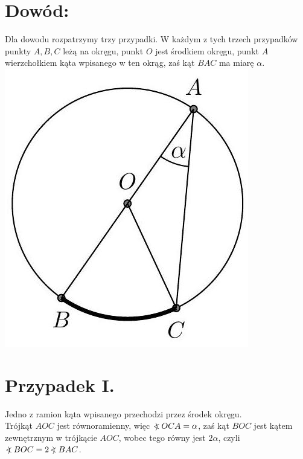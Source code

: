 \documentclass[10pt]{article}
\newcommand\Varangle{\mathop{{<\!\!\!\!\!\text{\small)}}\:}\nolimits}
\begin{document}
\section*{Dowód:}
Dla dowodu rozpatrzymy trzy przypadki. W każdym z tych trzech przypadków punkty \(A, B, C\) leżą na okręgu, punkt \(O\) jest środkiem okręgu, punkt \(A\) wierzchołkiem kąta wpisanego w ten okrąg, zaś kąt \(B A C\) ma miarę \(\alpha\).\\
\includegraphics[max width=\textwidth, center]{2024_11_21_71f62bd117d375398909g-181(1)}

\section*{Przypadek I.}
Jedno z ramion kąta wpisanego przechodzi przez środek okręgu.\\
Trójkąt \(A O C\) jest równoramienny, więc \(\Varangle O C A=\alpha\), zaś kąt \(B O C\) jest kątem zewnętrznym w trójkącie \(A O C\), wobec tego równy jest \(2 \alpha\), czyli \(\Varangle B O C=2 \Varangle B A C\).
\end{document}
